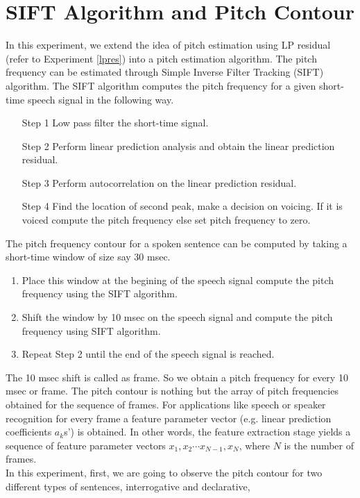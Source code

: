 \section{SIFT Algorithm and Pitch Contour}
\label{exp9}
In this experiment, we extend the idea of pitch estimation using LP
residual (refer to Experiment \ref{lpres}) into a pitch estimation
algorithm.
The pitch frequency can be estimated through Simple Inverse Filter
Tracking (SIFT) algorithm. The SIFT
algorithm computes the pitch frequency for a given short-time speech
signal in the following way.
\begin{itemize}
	\item [Step 1] Low pass filter the short-time signal.
	\item [Step 2] Perform linear prediction analysis and obtain
	the linear prediction residual.
	\item [Step 3] Perform autocorrelation on the linear
	prediction residual.
	\item [Step 4] Find the location of second peak, make a decision on
	voicing. If it is voiced compute the pitch frequency else set
	pitch frequency to zero.
\end{itemize}
The pitch frequency contour for a spoken sentence can be computed by
taking a short-time window of size say 30 msec. 
\begin{enumerate}

	\item Place this window at the begining of the speech signal
compute the pitch frequency using the SIFT algorithm.
	\item Shift the window by 10 msec on the speech signal and
compute the pitch frequency using SIFT algorithm.
	\item Repeat Step 2 until the end of the speech signal is
reached.
\end{enumerate}
The 10 msec shift is called as frame. So we obtain a pitch
frequency for every 10 msec or frame. The pitch contour is
nothing but the array of pitch frequencies obtained for the sequence of
frames. For applications like speech or speaker recognition for every
frame a feature parameter vector (e.g. linear prediction coefficients
$a_{k}$s') is obtained. In other words, the feature extraction stage
yields a sequence of feature parameter vectors $x_{1}, x_{2} \cdots
x_{N-1}, x_{N}$, where $N$ is the number of frames.\\[2ex]
\noindent
In this experiment, first, we are going to observe the pitch contour
for two different types of sentences, interrogative and declarative,
